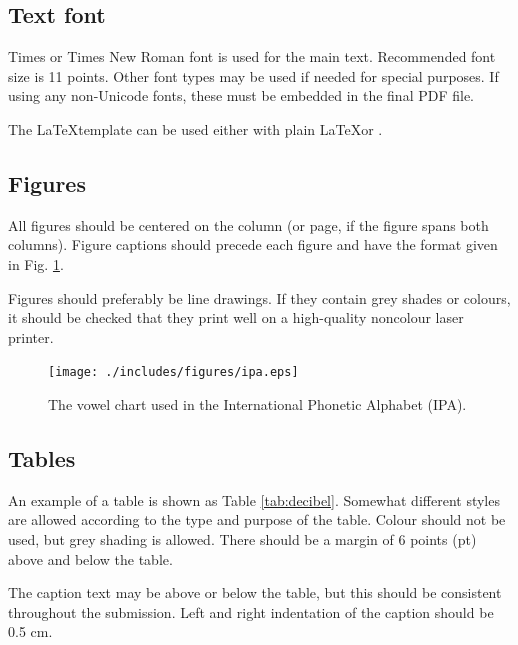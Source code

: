 \documentclass[a4paper,11pt,twocolumn]{article}
\begin{document}
\subsection{Text font}

Times or Times New Roman font is used for the main text. Recommended
font size is 11 points. Other font types may be used if needed for
special purposes. If using any non-Unicode fonts, these must be embedded
in the final PDF file.

The \LaTeX template can be used either with plain \LaTeX or \XeLaTeX.

\subsection{Figures}

All figures should be centered on the column (or page, if the figure
spans both columns). Figure captions should precede each figure and have
the format given in Fig. \ref{fig:vowels}.

Figures should preferably be line drawings. If they contain grey shades
or colours, it should be checked that they print well on a high-quality
noncolour laser printer.

\begin{figure}[!ht]
  \caption{The vowel chart used in the International Phonetic Alphabet (IPA).}
  \label{fig:vowels}
  \begin{center}
  \texttt{[image: ./includes/figures/ipa.eps]}
  \end{center}
\end{figure}

\subsection{Tables}

An example of a table is shown as Table \ref{tab:decibel}. Somewhat
different styles are allowed according to the type and purpose of the
table. Colour should not be used, but grey shading is allowed. There
should be a margin of 6 points (pt) above and below the table.

The caption text may be above or below the table, but this should be
consistent throughout the submission. Left and right indentation of the
caption should be 0.5 cm.
\end{document}
